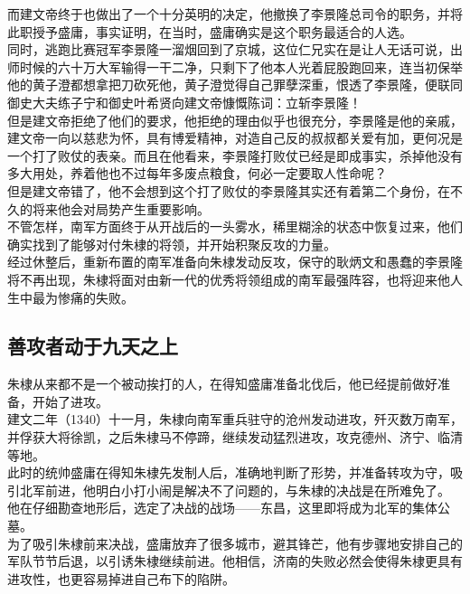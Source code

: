 \begin{multicols}{\theparacolNo}
而建文帝终于也做出了一个十分英明的决定，他撤换了李景隆总司令的职务，并将此职授予盛庸，事实证明，在当时，盛庸确实是这个职务最适合的人选。\\

同时，逃跑比赛冠军李景隆一溜烟回到了京城，这位仁兄实在是让人无话可说，出师时候的六十万大军输得一干二净，只剩下了他本人光着屁股跑回来，连当初保举他的黄子澄都想拿把刀砍死他，黄子澄觉得自己罪孽深重，恨透了李景隆，便联同御史大夫练子宁和御史叶希贤向建文帝慷慨陈词：立斩李景隆！\\

但是建文帝拒绝了他们的要求，他拒绝的理由似乎也很充分，李景隆是他的亲戚，建文帝一向以慈悲为怀，具有博爱精神，对造自己反的叔叔都关爱有加，更何况是一个打了败仗的表亲。而且在他看来，李景隆打败仗已经是即成事实，杀掉他没有多大用处，养着他也不过每年多废点粮食，何必一定要取人性命呢？\\

但是建文帝错了，他不会想到这个打了败仗的李景隆其实还有着第二个身份，在不久的将来他会对局势产生重要影响。\\

不管怎样，南军方面终于从开战后的一头雾水，稀里糊涂的状态中恢复过来，他们确实找到了能够对付朱棣的将领，并开始积聚反攻的力量。\\

经过休整后，重新布置的南军准备向朱棣发动反攻，保守的耿炳文和愚蠢的李景隆将不再出现，朱棣将面对由新一代的优秀将领组成的南军最强阵容，也将迎来他人生中最为惨痛的失败。\\

\subsection{善攻者动于九天之上}
朱棣从来都不是一个被动挨打的人，在得知盛庸准备北伐后，他已经提前做好准备，开始了进攻。\\

建文二年（1340）十一月，朱棣向南军重兵驻守的沧州发动进攻，歼灭数万南军，并俘获大将徐凯，之后朱棣马不停蹄，继续发动猛烈进攻，攻克德州、济宁、临清等地。\\

此时的统帅盛庸在得知朱棣先发制人后，准确地判断了形势，并准备转攻为守，吸引北军前进，他明白小打小闹是解决不了问题的，与朱棣的决战是在所难免了。\\

他在仔细勘查地形后，选定了决战的战场——东昌，这里即将成为北军的集体公墓。\\

为了吸引朱棣前来决战，盛庸放弃了很多城市，避其锋芒，他有步骤地安排自己的军队节节后退，以引诱朱棣继续前进。他相信，济南的失败必然会使得朱棣更具有进攻性，也更容易掉进自己布下的陷阱。\\


\end{multicols}
